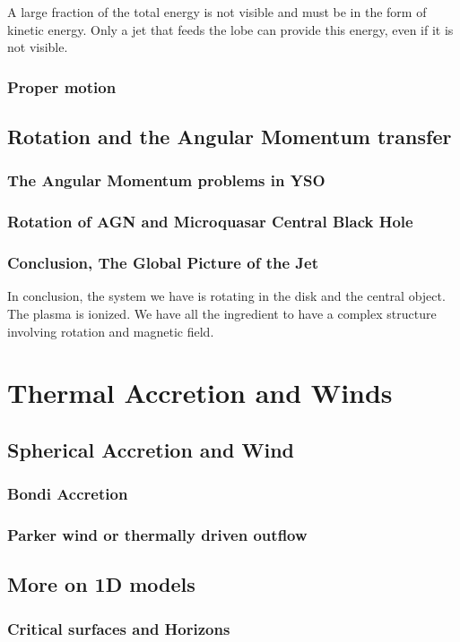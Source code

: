 \documentclass[10pt,a4paper,english,draft]{article}
\begin{document}
A large fraction of the total energy is not visible and must be in the form of kinetic energy. Only a jet that feeds the lobe can provide this energy, even if it is not visible.
\subsubsection{Proper motion}

\subsection{Rotation and the Angular Momentum transfer}
\subsubsection{The Angular Momentum problems in YSO}
\subsubsection{Rotation of AGN and Microquasar Central Black Hole}
\subsubsection{Conclusion, The Global Picture of the Jet}

In conclusion, the system we have is rotating in the disk and the central
object. The plasma is ionized. We have all the ingredient to have a complex
structure involving rotation and magnetic field.

\section{Thermal Accretion and Winds}
\subsection{Spherical Accretion and Wind}
\subsubsection{Bondi Accretion}
\subsubsection{Parker wind or thermally driven outflow}
\subsection{More on 1D models}
\subsubsection{Critical surfaces and Horizons}
\end{document}
